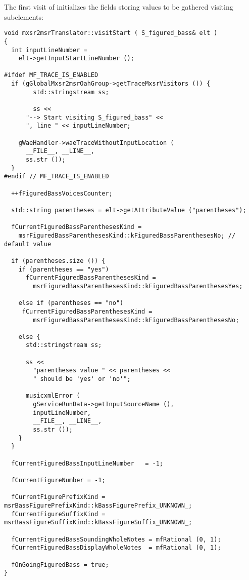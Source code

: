 The first visit of  initializes the fields storing values to be gathered visiting subelements:
\begin{lstlisting}[language=CPlusPlus]
void mxsr2msrTranslator::visitStart ( S_figured_bass& elt )
{
  int inputLineNumber =
    elt->getInputStartLineNumber ();

#ifdef MF_TRACE_IS_ENABLED
  if (gGlobalMxsr2msrOahGroup->getTraceMxsrVisitors ()) {
		std::stringstream ss;

		ss <<
      "--> Start visiting S_figured_bass" <<
      ", line " << inputLineNumber;

    gWaeHandler->waeTraceWithoutInputLocation (
      __FILE__, __LINE__,
      ss.str ());
  }
#endif // MF_TRACE_IS_ENABLED

  ++fFiguredBassVoicesCounter;

  std::string parentheses = elt->getAttributeValue ("parentheses");

  fCurrentFiguredBassParenthesesKind =
    msrFiguredBassParenthesesKind::kFiguredBassParenthesesNo; // default value

  if (parentheses.size ()) {
    if (parentheses == "yes")
      fCurrentFiguredBassParenthesesKind =
        msrFiguredBassParenthesesKind::kFiguredBassParenthesesYes;

    else if (parentheses == "no")
     fCurrentFiguredBassParenthesesKind =
        msrFiguredBassParenthesesKind::kFiguredBassParenthesesNo;

    else {
      std::stringstream ss;

      ss <<
        "parentheses value " << parentheses <<
        " should be 'yes' or 'no'";

      musicxmlError (
        gServiceRunData->getInputSourceName (),
        inputLineNumber,
        __FILE__, __LINE__,
        ss.str ());
    }
  }

  fCurrentFiguredBassInputLineNumber   = -1;

  fCurrentFigureNumber = -1;

  fCurrentFigurePrefixKind = msrBassFigurePrefixKind::kBassFigurePrefix_UNKNOWN_;
  fCurrentFigureSuffixKind = msrBassFigureSuffixKind::kBassFigureSuffix_UNKNOWN_;

  fCurrentFiguredBassSoundingWholeNotes = mfRational (0, 1);
  fCurrentFiguredBassDisplayWholeNotes  = mfRational (0, 1);

  fOnGoingFiguredBass = true;
}
\end{lstlisting}


